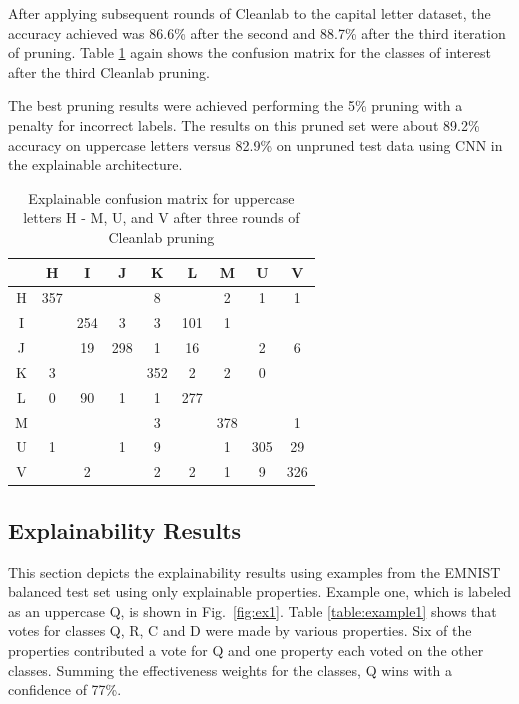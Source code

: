\documentclass[conference]{IEEEtran}
\begin{document}
After applying subsequent rounds of Cleanlab to the capital letter dataset, the
accuracy achieved was 86.6\% after the second and 88.7\% after the third
iteration of pruning. Table \ref{raw_cap_cleanlab_third_confusion_matrix} again
shows the confusion matrix for the classes of interest after the third Cleanlab
pruning.

The best pruning results were achieved performing the 5\% pruning with a penalty
for incorrect labels.  The results on this pruned set were about 89.2\% accuracy
on uppercase letters versus 82.9\% on unpruned test data using CNN in the
explainable architecture.  

\begin{table}
    \centering
    \caption{Explainable confusion matrix for uppercase letters H - M, U, and V after three rounds of Cleanlab pruning}
    \begin{tabular}{ |c|c|c|c|c|c|c|c|c|}
    \hline
    ~ & H & I & J & K & L & M & U & V \\
    \hline
    H & 357 & &  & 8 & & 2 & 1 & 1 \\
    \hline
    I &  & 254 & 3 & 3 & 101 & 1 & & \\
    \hline
    J & & 19 & 298 & 1 & 16 & & 2 & 6 \\
    \hline
    K & 3 &  &  & 352 & 2 & 2 & 0 & \\
    \hline
    L & 0 & 90 & 1 & 1 & 277 & & & \\
    \hline
    M & & & & 3 & & 378 & & 1 \\
    \hline
    U & 1 & & 1 & 9 & & 1 & 305 & 29 \\
    \hline
    V & & 2 & & 2 & 2 & 1 & 9 & 326 \\
    \hline
    \end{tabular}
    \label{raw_cap_cleanlab_third_confusion_matrix}
\end{table}


\subsection{Explainability Results}
\label{results:exp}


This section depicts the explainability results using examples from the EMNIST
balanced test set using only explainable properties.  Example one, which is
labeled as an uppercase Q, is shown in Fig.~\ref{fig:ex1}.  Table
\ref{table:example1} shows that votes for classes Q, R, C and D were made by
various properties.  Six of the properties contributed a vote for Q and one
property each voted on the other classes.  Summing the effectiveness weights for
the classes, Q wins with a confidence of 77\%.
\end{document}
